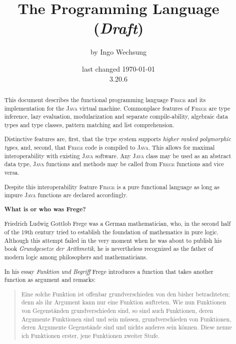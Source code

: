 \documentclass[lletterpaper,12pt]{report}
\date{last changed \today{} \\ 3.20.6}
\author{\small{by Ingo Wechsung}}
\title{The \frege{} Programming Language (\emph{Draft})}
\newcommand{\inmargin}[1]{\marginpar{\scriptsize\raggedright #1}}
\newcommand{\frege}[0]{\textsc{Frege}}
\newcommand{\java}[0]{\textsc{Java}}
\begin{document}
\maketitle



\begin{abstract}

This document describes the functional programming language \frege{}
and its implementation
for the \java{} virtual machine. Commonplace features of \frege{} are
type inference,
lazy evaluation,
modularization and separate compile-ability,
algebraic data types and type classes,
pattern matching and list comprehension.

Distinctive features are, first, that the type system supports
\emph{higher ranked polymorphic types},
and, second,
that \frege{} code is compiled to \java{}.
This allows for maximal interoperability with existing
\java{} software.
Any \java{} class may be used as an abstract data type, \java{}
functions and methods may be called from \frege{} functions and vice
versa.

Despite this interoperability feature  \frege{} is a pure functional language as long as impure \java{} functions are declared accordingly.

\begin{center}\textbf{What is or who was Frege?}\end{center}

Friedrich Ludwig Gottlob Frege
was a
German mathematician, who, in the second half of the 19th
century tried to establish the foundation of mathematics in pure
logic. Although this attempt failed in the very moment when he
was about to publish his book \emph{Grundgesetze der Arithmetik},
he is nevertheless recognized as the father of modern logic among
philosophers and mathematicians.

In his essay \emph{Funktion und Begriff} \cite{f1891} Frege introduces a function that takes another function as argument and remarks:

\begin{quote}
\small{
Eine solche Funktion ist offenbar grundverschieden von den bisher betrachteten; denn als ihr Argument kann nur eine Funktion auftreten. Wie nun Funktionen von Gegenständen grundverschieden sind, so sind auch Funktionen, deren Argumente Funktionen sind und sein müssen, grundverschieden von Funktionen, deren Argumente Gegenstände sind und nichts anderes sein können. Diese nenne ich Funktionen erster, jene Funktionen zweiter Stufe.
}
\end{quote}


\end{abstract}
\end{document}
